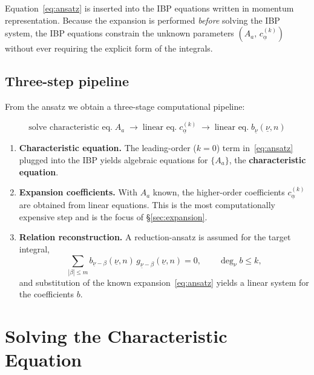 \documentclass[12pt]{article}
\begin{document}
Equation~\eqref{eq:ansatz} is inserted into the IBP equations written in
momentum representation.  Because the expansion is performed \emph{before} solving the
IBP system, the IBP equations constrain the unknown parameters $(A_a,\,c_{\underline\alpha}^{(k)})$
without ever requiring the explicit form of the integrals.

\subsection{Three-step pipeline}

From the ansatz we obtain a three-stage computational pipeline:

\[
\boxed{
  \text{solve characteristic eq.}\;A_a
  \;\xrightarrow{\quad}\;
  \text{linear eq.}\;c_{\underline\alpha}^{(k)}
  \;\xrightarrow{\quad}\;
  \text{linear eq.}\;b_{\underline\nu}(\underline\nu,n)
}
\tag{2.3}\label{eq:pipeline}
\]

\begin{enumerate}
  \item[\ref{eq:pipeline}a] \textbf{Characteristic equation.}  The leading-order
        ($k=0$) term in~\eqref{eq:ansatz} plugged into the IBP yields algebraic
        equations for $\{A_a\}$, the \textbf{characteristic equation}.
  \item[\ref{eq:pipeline}b] \textbf{Expansion coefficients.}  With $A_a$ known,
        the higher-order coefficients $c_{\underline\alpha}^{(k)}$ are obtained from
        linear equations.  This is the most computationally expensive step and is
        the focus of \S\ref{sec:expansion}.
  \item[\ref{eq:pipeline}c] \textbf{Relation reconstruction.}  A reduction-ansatz
        is assumed for the target integral,
        \[
          \sum_{|\beta|\le m} b_{\underline\nu-\beta}(\underline\nu,n)\,
          g_{\underline\nu-\beta}(\underline\nu,n)=0,
          \qquad \deg_{\nu}b\le k,
        \tag{2.4}\label{eq:ansatz_reduction}
        \]
        and substitution of the known expansion~\eqref{eq:ansatz} yields a linear
        system for the coefficients $b$.
\end{enumerate}

\section{Solving the Characteristic Equation}\label{sec:characteristic}
\end{document}
